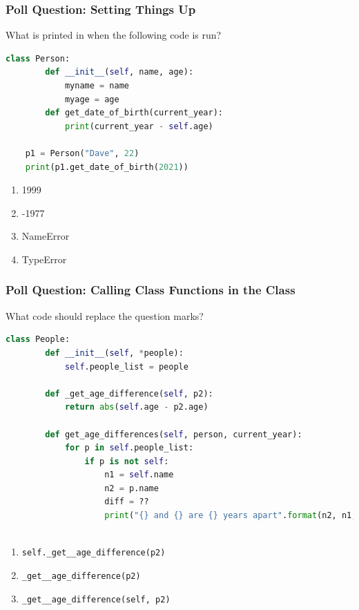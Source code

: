 \documentclass{beamer}
\begin{document}
%
%
\begin{frame}[fragile]
    \frametitle{Poll Question: Setting Things Up}
    What is printed in when the following code is run?
    \begin{lstlisting}[language=Python, autogobble]
    class Person:
        def __init__(self, name, age):
            myname = name
            myage = age
        def get_date_of_birth(current_year):
            print(current_year - self.age)

    p1 = Person("Dave", 22)
    print(p1.get_date_of_birth(2021))
    \end{lstlisting}
    \vfill
    \begin{enumerate}[A]
        \item 1999
        \item -1977
        \item NameError
        \item TypeError
    \end{enumerate}
\end{frame}

%
%
\begin{frame}[fragile]
    \frametitle{Poll Question: Calling Class Functions in the Class}
    What code should replace the question marks?
    \begin{lstlisting}[language=Python, autogobble, basicstyle=\tiny]
    class People:
        def __init__(self, *people):
            self.people_list = people

        def _get_age_difference(self, p2):
            return abs(self.age - p2.age)
            
        def get_age_differences(self, person, current_year):
            for p in self.people_list:
                if p is not self:
                    n1 = self.name
                    n2 = p.name
                    diff = ??
                    print("{} and {} are {} years apart".format(n2, n1, diff))
                        
    \end{lstlisting}
    \vfill
    \begin{enumerate}[A]
        \item \lstinline|self._get__age_difference(p2)|
        \item \lstinline|_get__age_difference(p2)|
        \item \lstinline|_get__age_difference(self, p2)|
    \end{enumerate}
\end{frame}
\end{document}
